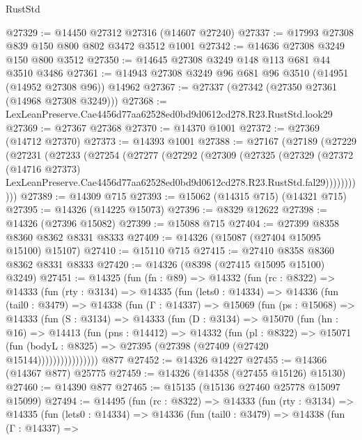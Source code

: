 \begin{lexlean}{RustStd}
\begin{coremodule}
@27329 := @14450 @27312 @27316 (@14607 @27240)
@27337 := @17993 @27308 @839 @150 @800 @802 @3472 @3512 @1001
@27342 := @14636 @27308 @3249 @150 @800 @3512
@27350 := @14645 @27308 @3249 @148 @113 @681 @44 @3510 @3486
@27361 := @14943 @27308 @3249 @96 @681 @96 @3510 (@14951 (@14952 @27308 @96)) @14962
@27367 := @27337 (@27342 (@27350 @27361 (@14968 @27308 @3249)))
@27368 := LexLeanPreserve.Cae4456d77aa62528ed0bd9d0612cd278.R23.RustStd.look29
@27369 := @27367 @27368
@27370 := @14370 @1001
@27372 := @27369 (@14712 @27370)
@27373 := @14393 @1001
@27388 := @27167
    (@27189
      (@27229
        (@27231
          (@27233
            (@27254
              (@27277
                (@27292
                  (@27309
                    (@27325
                      (@27329
                        (@27372
                          (@14716 @27373)
                          LexLeanPreserve.Cae4456d77aa62528ed0bd9d0612cd278.R23.RustStd.fal29)))))))))))
@27389 := @14309 @715
@27393 := @15062 (@14315 @715) (@14321 @715)
@27395 := @14326 (@14225 @15073)
@27396 := @8329 @12622
@27398 := @14326 (@27396 @15082)
@27399 := @15088 @715
@27404 := @27399 @8358 @8360 @8362 @8331 @8333
@27409 := @14326 (@15087 (@27404 @15095 @15100) @15107)
@27410 := @15110 @715
@27415 := @27410 @8358 @8360 @8362 @8331 @8333
@27420 := @14326 (@8398 (@27415 @15095 @15100) @3249)
@27451 := @14325
    (fun (fn : @89) =>
    @14332
      (fun (rc : @8322) =>
      @14333
        (fun (rty : @3134) =>
        @14335
          (fun (lets0 : @14334) =>
          @14336
            (fun (tail0 : @3479) =>
            @14338
              (fun (Γ : @14337) =>
              @15069
                (fun (ps : @15068) =>
                @14333
                  (fun (S : @3134) =>
                  @14333
                    (fun (D : @3134) =>
                    @15070
                      (fun (hn : @16) =>
                      @14413
                        (fun (pns : @14412) =>
                        @14332
                          (fun (pl : @8322) =>
                          @15071
                            (fun (bodyL : @8325) =>
                            @27395 (@27398 (@27409 (@27420 @15144))))))))))))))))
    @877
@27452 := @14326 @14227
@27455 := @14366 (@14367 @877) @25775
@27459 := @14326 (@14358 (@27455 @15126) @15130)
@27460 := @14390 @877
@27465 := @15135 (@15136 @27460 @25778 @15097 @15099)
@27494 := @14495
    (fun (rc : @8322) =>
    @14333
      (fun (rty : @3134) =>
      @14335
        (fun (lets0 : @14334) =>
        @14336
          (fun (tail0 : @3479) =>
          @14338
            (fun (Γ : @14337) =>

\end{coremodule}
\end{lexlean}
